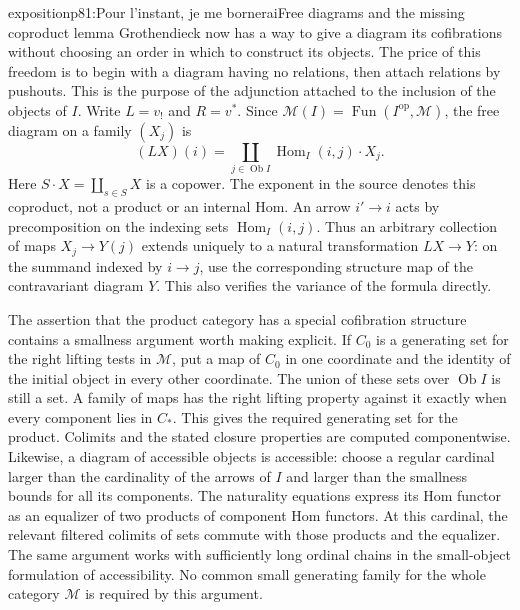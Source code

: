 \begin{dcomment}{exposition}{p81:Pour l'instant, je me bornerai}{Free diagrams and the missing coproduct lemma}
Grothendieck now has a way to give a diagram its cofibrations without choosing an order in which to construct its objects. The price of this freedom is to begin with a diagram having no relations, then attach relations by pushouts. This is the purpose of the adjunction attached to the inclusion of the objects of $I$. Write $L=v_!$ and $R=v^*$. Since $\mathcal M(I)=\operatorname{Fun}(I^{\mathrm{op}},\mathcal M)$, the free diagram on a family $(X_j)$ is
\[
 (LX)(i)=\coprod_{j\in\operatorname{Ob}I}
             \operatorname{Hom}_I(i,j)\cdot X_j.
\]
Here $S\cdot X=\coprod_{s\in S}X$ is a copower. The exponent in the source denotes this coproduct, not a product or an internal Hom. An arrow $i'\to i$ acts by precomposition on the indexing sets $\operatorname{Hom}_I(i,j)$. Thus an arbitrary collection of maps $X_j\to Y(j)$ extends uniquely to a natural transformation $LX\to Y$: on the summand indexed by $i\to j$, use the corresponding structure map of the contravariant diagram $Y$. This also verifies the variance of the formula directly.

The assertion that the product category has a special cofibration structure contains a smallness argument worth making explicit. If $C_0$ is a generating set for the right lifting tests in $\mathcal M$, put a map of $C_0$ in one coordinate and the identity of the initial object in every other coordinate. The union of these sets over $\operatorname{Ob}I$ is still a set. A family of maps has the right lifting property against it exactly when every component lies in $C_*$. This gives the required generating set for the product. Colimits and the stated closure properties are computed componentwise. Likewise, a diagram of accessible objects is accessible: choose a regular cardinal larger than the cardinality of the arrows of $I$ and larger than the smallness bounds for all its components. The naturality equations express its Hom functor as an equalizer of two products of component Hom functors. At this cardinal, the relevant filtered colimits of sets commute with those products and the equalizer. The same argument works with sufficiently long ordinal chains in the small-object formulation of accessibility. No common small generating family for the whole category $\mathcal M$ is required by this argument.


\end{dcomment}
